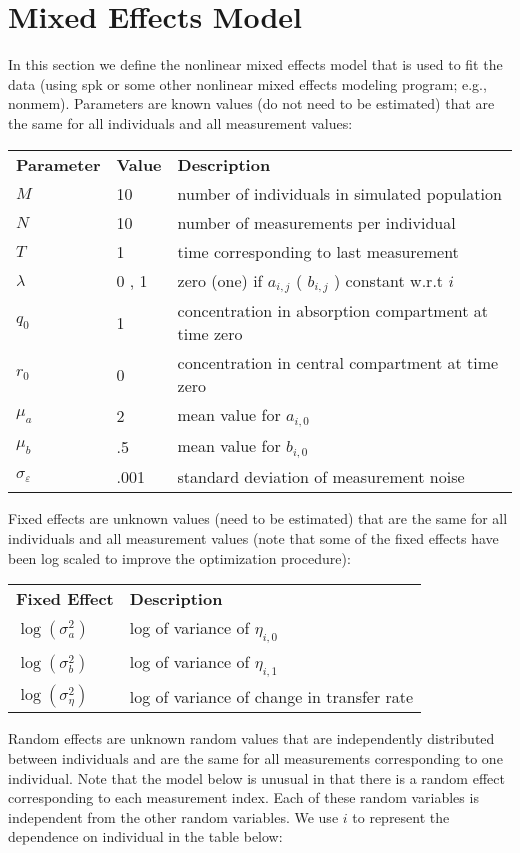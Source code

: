\documentclass{article}
\begin{document}
\section{Mixed Effects Model}
In this section we define the nonlinear mixed effects model
that is used to fit the data (using {\sc spk} or some other 
nonlinear mixed effects modeling program; e.g., {\sc nonmem}).
Parameters are known values 
(do not need to be estimated) that are the same for all individuals
and all measurement values:

\bigskip
\begin{tabular}{lll}
{\bf Parameter} & {\bf Value} & {\bf Description} 
\\
\( M \)        & 10
& number of individuals in simulated population
\\
\( N \)        & 10
& number of measurements per individual
\\
\( T \)        & 1
& time corresponding to last measurement
\\
\( \lambda \)  & 0 , 1
& zero (one) if \( a_{i,j} \) ( \( b_{i,j} \) ) constant w.r.t \( i \)
\\
\( q_0 \)      & 1
& concentration in absorption compartment at time zero
\\
\( r_0 \)     & 0
& concentration in central compartment at time zero
\\
\( \mu_a \)   & 2
& mean value for \( a_{i,0} \)
\\
\( \mu_b \)   & .5
& mean value for \( b_{i,0} \)
\\
\( \sigma_\varepsilon \) & .001
& standard deviation of measurement noise
\end{tabular}

\bigskip
\noindent
Fixed effects are unknown values 
(need to be estimated) that are the same for all individuals
and all measurement values
(note that some of the fixed effects have been log scaled to improve
the optimization procedure):

\bigskip
\begin{tabular}{ll}
{\bf Fixed Effect} & {\bf Description}
\\
\( \log ( \sigma_a^2 ) \)    & log of variance of \( \eta_{i,0} \) 
\\
\( \log ( \sigma_b^2 ) \)    & log of variance of \( \eta_{i,1} \) 
\\
\( \log ( \sigma_\eta^2 ) \) & log of variance of change in transfer rate
\end{tabular}


\bigskip
\noindent
Random effects are unknown random values that are independently distributed
between individuals 
and are the same for all measurements corresponding to one individual.
Note that the model below is unusual in that there is a random
effect corresponding to each measurement index.
Each of these random variables is independent from the other random variables.
We use \( i \) to represent the dependence on individual 
in the table below:
\end{document}
